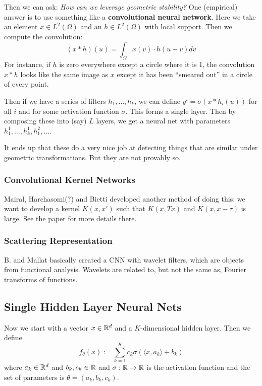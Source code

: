 \documentclass[12pt]{article}
\begin{document}
Then we can ask: \textit{How can we leverage geometric stability?} One (empirical) answer is to use something like a \textbf{convolutional neural network}. Here we take an element $x\in L^2(\Omega)$ and an $h\in L^2(\Omega)$ with local support. Then we compute the convolution:
\[(x\ast h)(u)=\int_\Omega x(v)\cdot h(u-v)dv\]
For instance, if $h$ is zero everywhere except a circle where it is 1, the convolution $x\ast h$ looks like the same image as $x$ except it has been ``smeared out'' in a circle of every point.

Then if we have a series of filters $h_1,\dots,h_k$, we can define $y^i=\sigma(x\ast h_i(u))$ for all $i$ and for some activation function $\sigma$. This forms a single layer.
Then by composing these into (say) $L$ layers, we get a neural net with parameters $h^1_1,\dots,h^1_k,h^2_1,\dots$.

It ends up that these do a very nice job at detecting things that are similar under geometric transformations. But they are not provably so.

\subsubsection{Convolutional Kernel Networks}
Mairal, Harchasomi(?) and Bietti developed another method of doing this: we want to develop a kernel $K(x,x')$ such that $K(x,Tx)$ and $K(x,x-\tau)$ is large.
See the paper for more details there.

\subsubsection{Scattering Representation}
B. and Mallat basically created a CNN with wavelet filters, which are objects from functional analysis. Wavelets are related to, but not the same as, Fourier transforms of functions.

\subsection{Single Hidden Layer Neural Nets}
Now we start with a vector $x\in\mathbb{R}^d$ and a $K$-dimensional hidden layer. Then we define 
\[f_\theta(x):=\sum_{k=1}^Kc_k\sigma(\langle x,a_k\rangle+b_k)\]
where $a_k\in\mathbb{R}^d$ and $b_k,c_k\in\mathbb{R}$ and $\sigma:\mathbb{R}\to \mathbb{R}$ is the activation function and the set of parameters is $\theta=(a_k,b_k,c_k)$.
\end{document}
